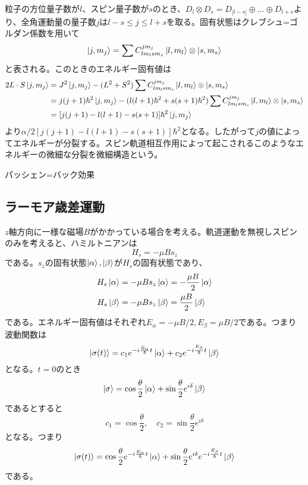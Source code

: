     粒子の方位量子数が$l$、スピン量子数が$s$のとき、$D_l \otimes D_s = D_{|l-s|} \oplus \dots \oplus D_{l+s}$より、全角運動量の量子数$j$は$l - s \leq j \leq l + s$を取る。固有状態はクレブシュ=ゴルダン係数を用いて
        \[\ket{j, m_j} = \sum C^{jm_j}_{lm_lsm_s} \ket{l, m_l} \otimes \ket{s, m_s}\]
    と表される。このときのエネルギー固有値は
    \begin{align*}
        2 L \cdot S \ket{j, m_j}
            &= J^2 \ket{j, m_j} - (L^2 + S^2) \sum C^{jm_j}_{lm_lsm_s} \ket{l, m_l} \otimes \ket{s, m_s}\\
            &= j(j + 1)\hbar^2 \ket{j, m_j} - (l(l + 1)\hbar^2 + s(s + 1)\hbar^2) \sum C^{jm_j}_{lm_lsm_s} \ket{l, m_l} \otimes \ket{s, m_s}\\
            &= [j(j + 1) - l(l + 1) - s(s + 1)]\hbar^2 \ket{j, m_j}
    \end{align*}
    より$\alpha/2 [j(j + 1) - l(l + 1) - s(s + 1)]\hbar^2$となる。したがって$j$の値によってエネルギーが分裂する。スピン軌道相互作用によって起こされるこのようなエネルギーの微細な分裂を微細構造という。

    パッシェン=バック効果

\subsection{ラーモア歳差運動}
    $z$軸方向に一様な磁場$B$がかかっている場合を考える。軌道運動を無視しスピンのみを考えると、ハミルトニアンは
        \[H_s = -\mu B s_z\]
    である。$s_z$の固有状態$\ket{\alpha}, \ket{\beta}$が$H_s$の固有状態であり、
    \begin{align*}
        H_s\ket{\alpha} &= -\mu B s_z\ket{\alpha} = -\frac{\mu B}{2}\ket{\alpha}\\
        H_s\ket{\beta} &= -\mu B s_z\ket{\beta} = \frac{\mu B}{2}\ket{\beta}
    \end{align*}
    である。エネルギー固有値はそれぞれ$E_\alpha = -\mu B/2, E_\beta = \mu B/2$である。つまり波動関数は
        \[\ket{\sigma(t)} = c_1e^{-i\frac{E_\alpha}{\hbar}t}\ket{\alpha} + c_2e^{-i\frac{E_\beta}{\hbar}t}\ket{\beta}\]
    となる。$t = 0$のとき
        \[\ket{\sigma} = \cos\frac{\theta}{2}\ket{\alpha} + \sin\frac{\theta}{2}e^{i\delta}\ket{\beta}\]
    であるとすると
        \[c_1 = \cos\frac{\theta}{2}, \quad c_2 = \sin\frac{\theta}{2}e^{i\delta}\]
    となる。つまり
        \[\ket{\sigma(t)} = \cos\frac{\theta}{2}e^{-i\frac{E_\alpha}{\hbar}t}\ket{\alpha} + \sin\frac{\theta}{2}e^{i\delta}e^{-i\frac{E_\beta}{\hbar}t}\ket{\beta}\]
    である。

